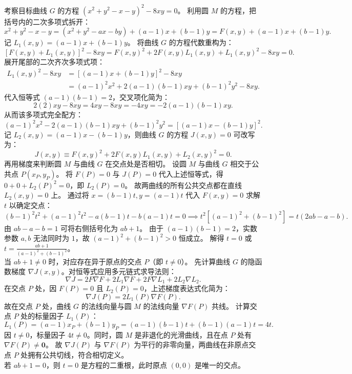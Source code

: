 \begin{solution}
考察目标曲线 $G$ 的方程 $(x^2 + y^2 - x - y)^2 - 8xy = 0$。
利用圆 $M$ 的方程，把括号内的二次多项式拆开：
\[ x^2 + y^2 - x - y = (x^2 + y^2 - ax - by) + (a - 1)x + (b - 1)y = F(x, y) + (a - 1)x + (b - 1)y. \]
记 $L_1(x, y) = (a - 1)x + (b - 1)y$。
将曲线 $G$ 的方程代数重构为：
\[ \left[F(x, y) + L_1(x, y)\right]^2 - 8xy = F(x, y)^2 + 2F(x, y)L_1(x, y) + L_1(x, y)^2 - 8xy = 0. \]
展开尾部的二次齐次多项式项：
\begin{align*}
L_1(x, y)^2 - 8xy &= \left[(a - 1)x + (b - 1)y\right]^2 - 8xy \\
&= (a - 1)^2 x^2 + 2(a - 1)(b - 1)xy + (b - 1)^2 y^2 - 8xy.
\end{align*}
代入恒等式 $(a - 1)(b - 1) = 2$，交叉项化简为：
\[ 2(2)xy - 8xy = 4xy - 8xy = -4xy = -2(a - 1)(b - 1)xy. \]
从而该多项式完全配方：
\[ (a - 1)^2 x^2 - 2(a - 1)(b - 1)xy + (b - 1)^2 y^2 = \left[(a - 1)x - (b - 1)y\right]^2. \]
记 $L_2(x, y) = (a - 1)x - (b - 1)y$，则曲线 $G$ 的方程 $J(x, y) = 0$ 可改写为：
\[ J(x, y) \equiv F(x, y)^2 + 2F(x, y)L_1(x, y) + L_2(x, y)^2 = 0. \]
再用梯度来判断圆 $M$ 与曲线 $G$ 在交点处是否相切。
设圆 $M$ 与曲线 $G$ 相交于公共点 $P(x_P, y_P)$。
将 $F(P) = 0$ 与 $J(P) = 0$ 代入上述恒等式，得 $0 + 0 + L_2(P)^2 = 0$，即 $L_2(P) = 0$。
故两曲线的所有公共交点都在直线 $L_2(x, y) = 0$ 上。
通过将 $x = (b - 1)t, y = (a - 1)t$ 代入 $F(x, y) = 0$ 求解 $t$ 以确定交点：
\[ (b - 1)^2 t^2 + (a - 1)^2 t^2 - a(b - 1)t - b(a - 1)t = 0 \implies t^2\left[(a - 1)^2 + (b - 1)^2\right] = t(2ab - a - b). \]
由 $ab - a - b = 1$ 可将右侧括号化为 $ab + 1$。
由于 $(a - 1)(b - 1) = 2$，实数参数 $a, b$ 无法同时为 $1$，故 $(a - 1)^2 + (b - 1)^2 > 0$ 恒成立。
解得 $t = 0$ 或 $t = \frac{ab + 1}{(a - 1)^2 + (b - 1)^2}$。\\
当 $ab + 1 \neq 0$ 时，对应存在异于原点的交点 $P$（即 $t \neq 0$）。
先计算曲线 $G$ 的隐函数梯度 $\nabla J(x, y)$。对恒等式应用多元链式求导法则：
\[ \nabla J = 2F \nabla F + 2L_1 \nabla F + 2F \nabla L_1 + 2L_2 \nabla L_2. \]
在交点 $P$ 处，因 $F(P) = 0$ 且 $L_2(P) = 0$，上述梯度表达式化简为：
\[ \nabla J(P) = 2L_1(P) \nabla F(P). \]
故在交点 $P$ 处，曲线 $G$ 的法线向量与圆 $M$ 的法线向量 $\nabla F(P)$ 共线。
计算交点 $P$ 处的标量因子 $L_1(P)$：
\[ L_1(P) = (a - 1)x_P + (b - 1)y_P = (a - 1)(b - 1)t + (b - 1)(a - 1)t = 4t. \]
因 $t \neq 0$，标量因子 $4t \neq 0$。同时，圆 $M$ 是非退化的光滑曲线，且在点 $P$ 处有 $\nabla F(P) \neq \mathbf{0}$。
故 $\nabla J(P)$ 与 $\nabla F(P)$ 为平行的非零向量，两曲线在非原点交点 $P$ 处拥有公共切线，符合相切定义。\\
若 $ab + 1 = 0$，则 $t = 0$ 是方程的二重根，此时原点 $(0,0)$ 是唯一的交点。

\end{solution}
